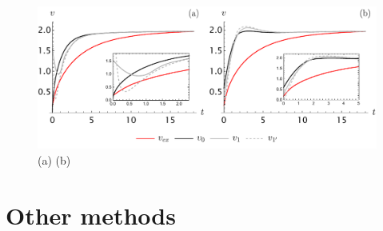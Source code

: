 \documentclass[amsmath,amssymb,amsfonts,aps,pre,preprint,superscriptaddress,bibnotes,showpacs,showkeys,longbibliography]{revtex4-1}
\begin{document}
\begin{figure}[!h]
    \centering
    \includegraphics[width=\linewidth]{Figures/VelocityMethodsGrid.pdf}
    \caption{(a) (b) }
    \label{fig:VelocityMethodsGrid}
\end{figure}

\section{Other methods}\label{sec:Other_Methods}

\end{document}
